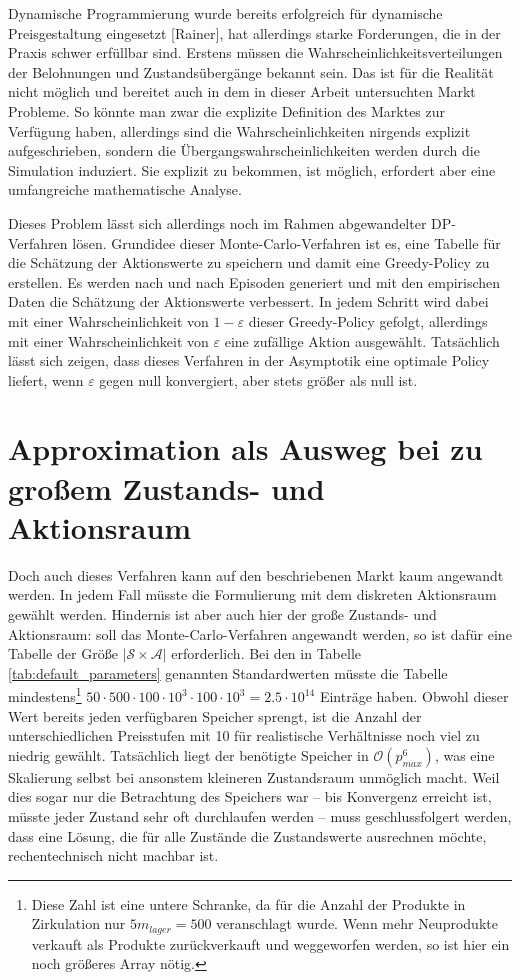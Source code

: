 Dynamische Programmierung wurde bereits erfolgreich für dynamische Preisgestaltung eingesetzt [Rainer], hat allerdings starke Forderungen, die in der Praxis schwer erfüllbar sind.
Erstens müssen die Wahrscheinlichkeitsverteilungen der Belohnungen und Zustandsübergänge bekannt sein.
Das ist für die Realität nicht möglich und bereitet auch in dem in dieser Arbeit untersuchten Markt Probleme.
So könnte man zwar die explizite Definition des Marktes zur Verfügung haben, allerdings sind die Wahrscheinlichkeiten nirgends explizit aufgeschrieben, sondern die Übergangswahrscheinlichkeiten werden durch die Simulation induziert.
Sie explizit zu bekommen, ist möglich, erfordert aber eine umfangreiche mathematische Analyse.

Dieses Problem lässt sich allerdings noch im Rahmen abgewandelter DP-Verfahren lösen.
Grundidee dieser Monte-Carlo-Verfahren ist es, eine Tabelle für die Schätzung der Aktionswerte zu speichern und damit eine Greedy-Policy zu erstellen.
Es werden nach und nach Episoden generiert und mit den empirischen Daten die Schätzung der Aktionswerte verbessert.
In jedem Schritt wird dabei mit einer Wahrscheinlichkeit von $1-\varepsilon$ dieser Greedy-Policy gefolgt, allerdings mit einer Wahrscheinlichkeit von $\varepsilon$ eine zufällige Aktion ausgewählt.
Tatsächlich lässt sich zeigen, dass dieses Verfahren in der Asymptotik eine optimale Policy liefert, wenn $\varepsilon$ gegen null konvergiert, aber stets größer als null ist. \cite{Sutton1998}

\section{Approximation als Ausweg bei zu großem Zustands- und Aktionsraum}
Doch auch dieses Verfahren kann auf den beschriebenen Markt kaum angewandt werden.
In jedem Fall müsste die Formulierung mit dem diskreten Aktionsraum gewählt werden.
Hindernis ist aber auch hier der große Zustands- und Aktionsraum: soll das Monte-Carlo-Verfahren angewandt werden, so ist dafür eine Tabelle der Größe $|\mathcal{S} \times \mathcal{A}|$ erforderlich.
Bei den in Tabelle \ref{tab:default_parameters} genannten Standardwerten müsste die Tabelle mindestens\footnote{
    Diese Zahl ist eine untere Schranke, da für die Anzahl der Produkte in Zirkulation nur $5 m_{lager}=500$ veranschlagt wurde.
    Wenn mehr Neuprodukte verkauft als Produkte zurückverkauft und weggeworfen werden, so ist hier ein noch größeres Array nötig.
} $50 \cdot 500 \cdot 100 \cdot 10^3 \cdot 100 \cdot 10^3 = 2.5 \cdot 10^{14}$ Einträge haben.
Obwohl dieser Wert bereits jeden verfügbaren Speicher sprengt, ist die Anzahl der unterschiedlichen Preisstufen mit 10 für realistische Verhältnisse noch viel zu niedrig gewählt.
Tatsächlich liegt der benötigte Speicher in $\mathcal{O}\left(p_{max}^6\right)$, was eine Skalierung selbst bei ansonstem kleineren Zustandsraum unmöglich macht.
Weil dies sogar nur die Betrachtung des Speichers war -- bis Konvergenz erreicht ist, müsste jeder Zustand sehr oft durchlaufen werden -- muss geschlussfolgert werden, dass eine Lösung, die für alle Zustände die Zustandswerte ausrechnen möchte, rechentechnisch nicht machbar ist.

